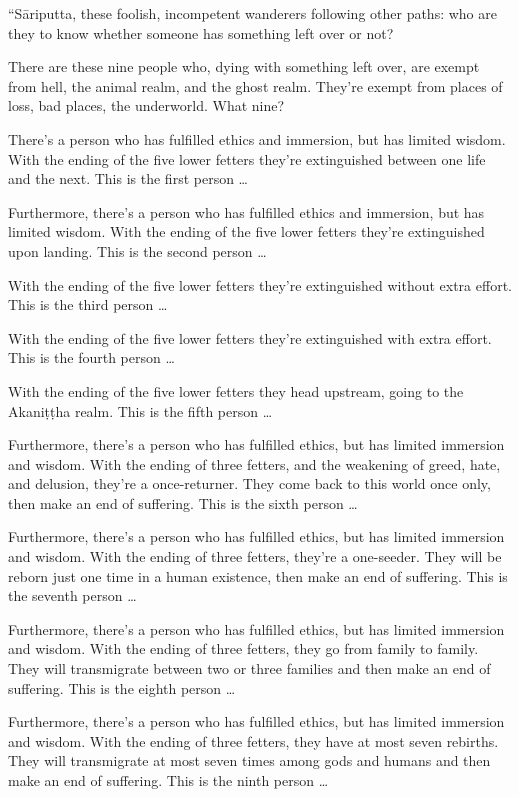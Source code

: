 \documentclass[12pt,openany]{book}%
\begin{document}
“\textsanskrit{Sāriputta}, these foolish, incompetent wanderers following other paths: who are they to know whether someone has something left over or not? 

There are these nine people who, dying with something left over, are exempt from hell, the animal realm, and the ghost realm. They’re exempt from places of loss, bad places, the underworld. What nine? 

There’s a person who has fulfilled ethics and immersion, but has limited wisdom. With the ending of the five lower fetters they’re extinguished between one life and the next. This is the first person … 

Furthermore, there’s a person who has fulfilled ethics and immersion, but has limited wisdom. With the ending of the five lower fetters they’re extinguished upon landing. This is the second person … 

With the ending of the five lower fetters they’re extinguished without extra effort. This is the third person … 

With the ending of the five lower fetters they’re extinguished with extra effort. This is the fourth person … 

With the ending of the five lower fetters they head upstream, going to the \textsanskrit{Akaniṭṭha} realm. This is the fifth person … 

Furthermore, there’s a person who has fulfilled ethics, but has limited immersion and wisdom. With the ending of three fetters, and the weakening of greed, hate, and delusion, they’re a once-returner. They come back to this world once only, then make an end of suffering. This is the sixth person … 

Furthermore, there’s a person who has fulfilled ethics, but has limited immersion and wisdom. With the ending of three fetters, they’re a one-seeder. They will be reborn just one time in a human existence, then make an end of suffering. This is the seventh person … 

Furthermore, there’s a person who has fulfilled ethics, but has limited immersion and wisdom. With the ending of three fetters, they go from family to family. They will transmigrate between two or three families and then make an end of suffering. This is the eighth person … 

Furthermore, there’s a person who has fulfilled ethics, but has limited immersion and wisdom. With the ending of three fetters, they have at most seven rebirths. They will transmigrate at most seven times among gods and humans and then make an end of suffering. This is the ninth person … 
\end{document}
